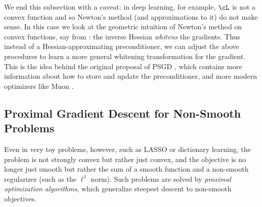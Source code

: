 \documentclass[../../book-main.tex]{subfiles}
\begin{document}
We end this subsection with a caveat: in deep learning, for example, \(\cL\) is not a convex function and so Newton's method (and approximations to it) do not make sense. In this case we look at the geometric intuition of Newton's method on convex functions, say from : the inverse Hessian \textit{whitens} the gradients. Thus instead of a Hessian-approximating preconditioner, we can adjust the above procedures to learn a more general whitening transformation for the gradient. This is the idea behind the original proposal of PSGD \cite{li2017preconditioned}, which contains more information about how to store and update the preconditioner, and more modern optimizers like Muon \cite{liu2025muon}.


\subsection{Proximal Gradient Descent for Non-Smooth Problems}

Even in very toy problems, however, such as LASSO or dictionary learning, the problem is not strongly convex but rather just convex, and the objective is no longer just smooth but rather the sum of a smooth function and a non-smooth regularizer (such as the \(\ell^{1}\) norm). Such problems are solved by \textit{proximal optimization algorithms}, which generalize steepest descent to non-smooth objectives.
\end{document}

